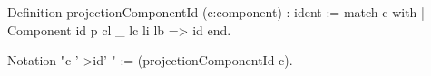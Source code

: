 Definition projectionComponentId (c:component) : ident :=
   match c with
     | Component id p cl _ lc li lb => id
   end.
  
Notation "c '->id' " := (projectionComponentId c).